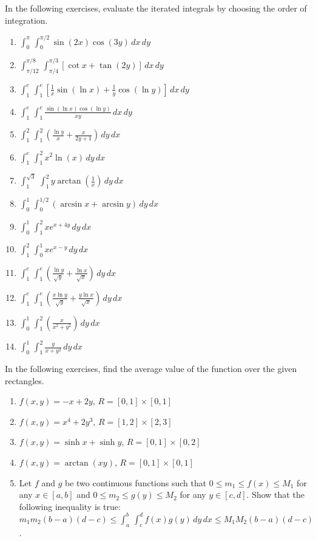 \documentclass{exercises}
\begin{document}
In the following exercises, evaluate the iterated integrals by choosing the order of integration.

\begin{enumerate}[resume]
\item $\int_{0}^{\pi}\,\int_{0}^{\pi/2}\sin(2x)\cos(3y)\,dx\,dy$
\item $\int_{\pi/12}^{\pi/8}\,\int_{\pi/4}^{\pi/3}[\cot x+\tan(2y)]\,dx\,dy$
\item $\int_{1}^{e}\,\int_{1}^{e}[\frac{1}{x}\sin(\ln x)+\frac{1}{y}\cos(\ln y)]\,dx\,dy$
\item $\int_{1}^{e}\,\int_{1}^{e}\frac{\sin(\ln x)\cos(\ln y)}{xy}\,dx\,dy$
\item $\int_{1}^{2}\,\int_{1}^{2}(\frac{\ln y}{x}+\frac{x}{2y+1})\,dy\,dx$
\item $\int_{1}^{e}\,\int_{1}^{2}x^{2}\ln(x)\,dy\,dx$
\item $\int_{1}^{\sqrt{3}}\,\int_{1}^{2}y\arctan(\frac{1}{x})\,dy\,dx$
\item $\int_{0}^{1}\,\int_{0}^{1/2}(\arcsin x+\arcsin y)\,dy\,dx$
\item $\int_{0}^{1}\,\int_{1}^{2}xe^{x+4y}\,dy\,dx$
\item $\int_{1}^{2}\,\int_{0}^{1}xe^{x-y}\,dy\,dx$
\item $\int_{1}^{e}\,\int_{1}^{e}(\frac{\ln y}{\sqrt{y}}+\frac{\ln x}{\sqrt{x}})\,dy\,dx$
\item $\int_{1}^{e}\,\int_{1}^{e}(\frac{x\ln y}{\sqrt{y}}+\frac{y\ln x}{\sqrt{x}})\,dy\,dx$
\item $\int_{0}^{1}\,\int_{1}^{2}(\frac{x}{x^{2}+y^{2}})\,dy\,dx$
\item $\int_{0}^{1}\,\int_{1}^{2}\frac{y}{x+y^{2}}\,dy\,dx$
\end{enumerate}

In the following exercises, find the average value of the function over the given rectangles.

\begin{enumerate}[resume]
\item $f(x,y)=-x+2y$, $R=[0,1]\times [0,1]$
\item $f(x,y)=x^{4}+2y^{3}$, $R=[1,2]\times [2,3]$
\item $f(x,y)=\sinh x+\sinh y$, $R=[0,1]\times [0,2]$
\item $f(x,y)=\arctan(xy)$, $R=[0,1]\times [0,1]$
\item Let $f$ and $g$ be two continuous functions such that $0\le m_{1}\le f(x)\le M_{1}$ for any $x\in[a,b]$ and $0\le m_{2}\le g(y)\le M_{2}$ for any $y\in[c,d]$. Show that the following inequality is true: $m_{1}m_{2}(b-a)(d-c)\le \int_{a}^{b}\,\int_{c}^{d}f(x)g(y)\,dy\,dx\le M_{1}M_{2}(b-a)(d-c)$.
\end{enumerate}
\end{document}
